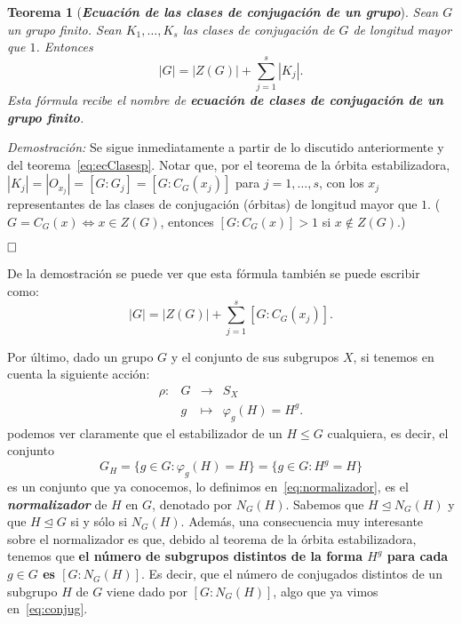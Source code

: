 \documentclass[12pt]{article}
\newtheorem{theorem}{Teorema}[section]
\begin{document}
\begin{theorem}[\textit{\textbf{Ecuación de las clases de conjugación de un grupo}}]\label{eq:ecClases}
Sean $G$ un grupo finito. Sean $K_{1}, \ldots, K_{s}$ las clases de conjugación de $G$ de longitud mayor que $1$. Entonces $$|G| = |Z(G)| + \sum_{j=1}^{s} |K_{j}|.$$ Esta fórmula recibe el nombre de \textbf{ecuación de clases de conjugación de un grupo finito}.
\end{theorem} 
\emph{Demostración: } Se sigue inmediatamente a partir de lo discutido anteriormente y del teorema~\ref{eq:ecClasesp}. Notar que, por el teorema de la órbita estabilizadora, $|K_{j}| = |O_{x_{j}}| = [G:G_{j}] = [G:C_{G}(x_{j})]$ para $j=1, \ldots, s$, con los $x_{j}$ representantes de las clases de conjugación (órbitas) de longitud mayor que $1$.   ($G = C_{G}(x) \Longleftrightarrow x \in Z(G)$, entonces $\left[ G:C_{G}(x) \right] > 1$ si $x \notin Z(G)$.)

$\hfill \square$

De la demostración se puede ver que esta fórmula también se puede escribir como:
$$|G| = |Z(G)| + \sum_{j=1}^{s}[G:C_{G}(x_{j})].$$

Por último, dado un grupo $G$ y el conjunto de sus subgrupos $X$, si tenemos en cuenta la siguiente acción: $$\begin{array}{rccl}
\rho\colon &G& \longrightarrow &S_{X}\\
&g& \longmapsto &\varphi_{g}(H) = H^{g}.
\end{array}
$$ 
podemos ver claramente que el estabilizador de un $H \leq G$ cualquiera, es decir, el conjunto $$G_{H}= \lbrace g\in G: \varphi_{g}(H) = H \rbrace = \lbrace g \in G: H^{g} = H \rbrace$$ es un conjunto que ya conocemos, lo definimos en~\ref{eq:normalizador}, es el \textbf{\textit{normalizador}} de $H$ en $G$, denotado por $N_{G}(H)$. Sabemos que $H \unlhd N_{G}(H)$ y que $H \unlhd G$ si y sólo si $N_{G}(H)$. Además, una consecuencia muy interesante sobre el normalizador es que, debido al teorema de la órbita estabilizadora, tenemos que \textbf{el número de subgrupos distintos de la forma $H^{g}$ para cada $g \in G$ es $[G:N_{G}(H)]$}. Es decir, que el número de conjugados distintos de un subgrupo $H$ de $G$ viene dado por $[G:N_{G}(H)]$, algo que ya vimos en~\ref{eq:conjug}.
\end{document}
